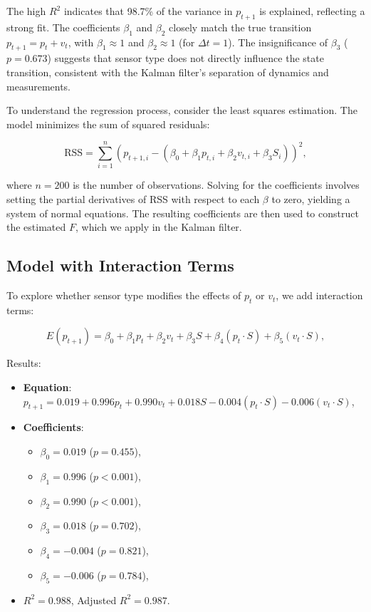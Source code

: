 \documentclass[12pt]{article}
\begin{document}
The high \( R^2 \) indicates that 98.7\% of the variance in \( p_{t+1} \) is explained, reflecting a strong fit. The coefficients \( \beta_1 \) and \( \beta_2 \) closely match the true transition \( p_{t+1} = p_t + v_t \), with \( \beta_1 \approx 1 \) and \( \beta_2 \approx 1 \) (for \( \Delta t = 1 \)). The insignificance of \( \beta_3 \) (\( p = 0.673 \)) suggests that sensor type does not directly influence the state transition, consistent with the Kalman filter’s separation of dynamics and measurements.

To understand the regression process, consider the least squares estimation. The model minimizes the sum of squared residuals:

\begin{equation}
    \text{RSS} = \sum_{i=1}^n (p_{t+1,i} - (\beta_0 + \beta_1 p_{t,i} + \beta_2 v_{t,i} + \beta_3 S_i))^2,
    \label{eq:rss}
\end{equation}

where \( n = 200 \) is the number of observations. Solving for the coefficients involves setting the partial derivatives of RSS with respect to each \( \beta \) to zero, yielding a system of normal equations. The resulting coefficients are then used to construct the estimated \( F \), which we apply in the Kalman filter.

\subsection{Model with Interaction Terms}
\label{subsec:interaction}

To explore whether sensor type modifies the effects of \( p_t \) or \( v_t \), we add interaction terms:

\begin{equation}
    E(p_{t+1}) = \beta_0 + \beta_1 p_t + \beta_2 v_t + \beta_3 S + \beta_4 (p_t \cdot S) + \beta_5 (v_t \cdot S),
    \label{eq:interaction_model}
\end{equation}

Results:
\begin{itemize}
    \item \textbf{Equation}: \( p_{t+1} = 0.019 + 0.996 p_t + 0.990 v_t + 0.018 S - 0.004 (p_t \cdot S) - 0.006 (v_t \cdot S) \),
    \item \textbf{Coefficients}:
    \begin{itemize}
        \item \( \beta_0 = 0.019 \) (\( p = 0.455 \)),
        \item \( \beta_1 = 0.996 \) (\( p < 0.001 \)),
        \item \( \beta_2 = 0.990 \) (\( p < 0.001 \)),
        \item \( \beta_3 = 0.018 \) (\( p = 0.702 \)),
        \item \( \beta_4 = -0.004 \) (\( p = 0.821 \)),
        \item \( \beta_5 = -0.006 \) (\( p = 0.784 \)),
    \end{itemize}
    \item \( R^2 = 0.988 \), Adjusted \( R^2 = 0.987 \).
\end{itemize}
\end{document}
